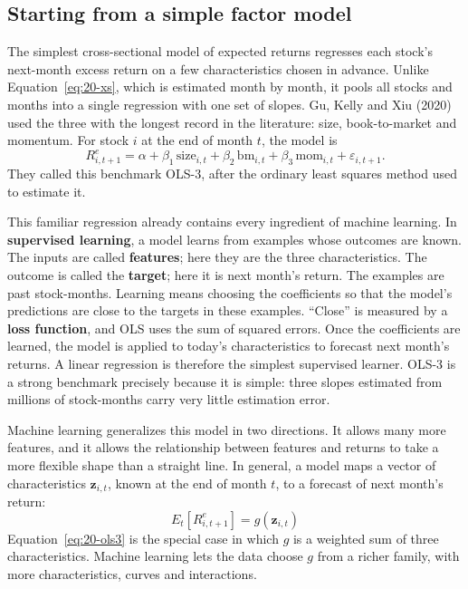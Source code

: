 \subsection{Starting from a simple factor model}
\label{sec:20-simple}

The simplest cross-sectional model of expected returns regresses each stock's next-month excess return on a few characteristics chosen in advance. Unlike Equation~\eqref{eq:20-xs}, which is estimated month by month, it pools all stocks and months into a single regression with one set of slopes. Gu, Kelly and Xiu (2020) used the three with the longest record in the literature: size, book-to-market and momentum. For stock $i$ at the end of month $t$, the model is
\begin{equation}
  R^{e}_{i,t+1} = \alpha + \beta_1\,\text{size}_{i,t} + \beta_2\,\text{bm}_{i,t} + \beta_3\,\text{mom}_{i,t} + \varepsilon_{i,t+1}.
  \label{eq:20-ols3}
\end{equation}
They called this benchmark OLS-3, after the ordinary least squares method used to estimate it.

This familiar regression already contains every ingredient of machine learning. In \textbf{supervised learning}, a model learns from examples whose outcomes are known. The inputs are called \textbf{features}; here they are the three characteristics. The outcome is called the \textbf{target}; here it is next month's return. The examples are past stock-months. Learning means choosing the coefficients so that the model's predictions are close to the targets in these examples. ``Close'' is measured by a \textbf{loss function}, and OLS uses the sum of squared errors. Once the coefficients are learned, the model is applied to today's characteristics to forecast next month's returns. A linear regression is therefore the simplest supervised learner. OLS-3 is a strong benchmark precisely because it is simple: three slopes estimated from millions of stock-months carry very little estimation error.

Machine learning generalizes this model in two directions. It allows many more features, and it allows the relationship between features and returns to take a more flexible shape than a straight line. In general, a model maps a vector of characteristics $\mathbf{z}_{i,t}$, known at the end of month $t$, to a forecast of next month's return:
\begin{equation}
  E_t[R^{e}_{i,t+1}] = g(\mathbf{z}_{i,t})
  \label{eq:20-g}
\end{equation}
Equation~\eqref{eq:20-ols3} is the special case in which $g$ is a weighted sum of three characteristics. Machine learning lets the data choose $g$ from a richer family, with more characteristics, curves and interactions.

